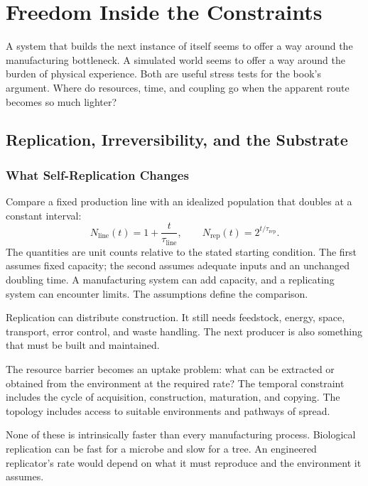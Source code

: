 \chapter{Freedom Inside the Constraints}

A system that builds the next instance of itself seems to offer a way around the manufacturing bottleneck. A simulated world seems to offer a way around the burden of physical experience. Both are useful stress tests for the book's argument. Where do resources, time, and coupling go when the apparent route becomes so much lighter?

\section{Replication, Irreversibility, and the Substrate}

\subsection{What Self-Replication Changes}

Compare a fixed production line with an idealized population that doubles at a constant interval:
\begin{equation}
 N_{\mathrm{line}}(t)=1+\frac{t}{\tau_{\mathrm{line}}},
 \qquad
 N_{\mathrm{rep}}(t)=2^{t/\tau_{\mathrm{rep}}}.
\end{equation}
The quantities are unit counts relative to the stated starting condition. The first assumes fixed capacity; the second assumes adequate inputs and an unchanged doubling time. A manufacturing system can add capacity, and a replicating system can encounter limits. The assumptions define the comparison.

Replication can distribute construction. It still needs feedstock, energy, space, transport, error control, and waste handling. The next producer is also something that must be built and maintained.

The resource barrier becomes an uptake problem: what can be extracted or obtained from the environment at the required rate? The temporal constraint includes the cycle of acquisition, construction, maturation, and copying. The topology includes access to suitable environments and pathways of spread.

None of these is intrinsically faster than every manufacturing process. Biological replication can be fast for a microbe and slow for a tree. An engineered replicator's rate would depend on what it must reproduce and the environment it assumes.

